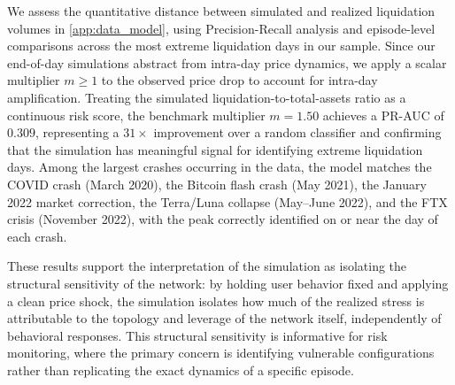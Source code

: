 \documentclass[a4paper,UKenglish,cleveref, autoref, thm-restate]{informs3}
\begin{document}

We assess the quantitative distance between simulated and realized liquidation volumes in \ref{app:data_model}, using Precision-Recall analysis and episode-level comparisons across the most extreme liquidation days in our sample.  Since our 
end-of-day simulations abstract from intra-day price dynamics, 
we apply a scalar multiplier $m \geq 1$ to the observed price 
drop to account for intra-day amplification. Treating the 
simulated liquidation-to-total-assets ratio as a continuous 
risk score, the benchmark multiplier $m = 1.50$ achieves a 
PR-AUC of $0.309$, representing a $31\times$ improvement over 
a random classifier and confirming that the simulation has 
meaningful signal for identifying extreme liquidation days. Among the largest crashes occurring in the data, the model matches the COVID crash (March 2020), 
the Bitcoin flash crash (May 2021), the January 2022 market 
correction, the Terra/Luna collapse (May--June 2022), and the 
FTX crisis (November 2022), with the peak correctly identified 
on or near the day of each crash.

These results support the interpretation of the simulation as 
isolating the structural sensitivity of the network: by holding user behavior fixed and applying a clean price shock, the simulation isolates how much of the realized stress is attributable to the topology and leverage of the network itself, independently of behavioral responses. This structural sensitivity is informative for risk monitoring, where the primary concern is identifying vulnerable configurations rather than replicating the exact dynamics of a specific episode.


\medskip
\end{document}
